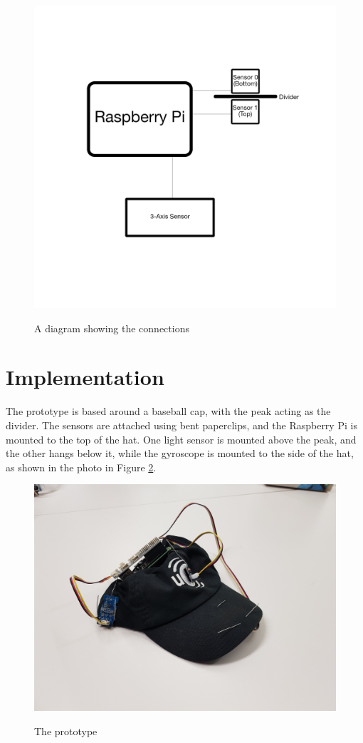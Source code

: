 \documentclass[12pt, a4paper]{report}
\begin{document}
\begin{figure}
  \centering
  \caption{A diagram showing the connections}
  \includegraphics[width=1\textwidth]{Diagram.png}
  \label{fig:diagram}
\end{figure}


\section{Implementation}

The prototype is based around a baseball cap, with the peak acting as the divider.
The sensors are attached using bent paperclips, and the Raspberry Pi is mounted to the top of the hat.
One light sensor is mounted above the peak, and the other hangs below it, while the gyroscope is mounted to the side of the hat, as shown in the photo in Figure \ref{fig:hatpic}.

\begin{figure}
  \centering
  \caption{The prototype}
  \includegraphics[width=1\textwidth]{hatpic.jpg}
  \label{fig:hatpic}
\end{figure}
\end{document}
